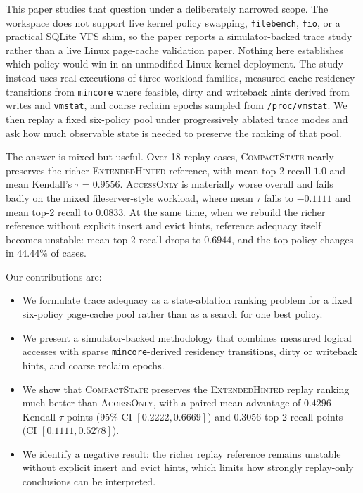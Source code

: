 \documentclass{article}
\newcommand{\traceext}{\textsc{ExtendedHinted}}
\newcommand{\tracecompact}{\textsc{CompactState}}
\newcommand{\traceaccess}{\textsc{AccessOnly}}
\begin{document}
This paper studies that question under a deliberately narrowed scope. The workspace does not support live kernel policy swapping, \texttt{filebench}, \texttt{fio}, or a practical SQLite VFS shim, so the paper reports a simulator-backed trace study rather than a live Linux page-cache validation paper. Nothing here establishes which policy would win in an unmodified Linux kernel deployment. The study instead uses real executions of three workload families, measured cache-residency transitions from \texttt{mincore} where feasible, dirty and writeback hints derived from writes and \texttt{vmstat}, and coarse reclaim epochs sampled from \texttt{/proc/vmstat}. We then replay a fixed six-policy pool under progressively ablated trace modes and ask how much observable state is needed to preserve the ranking of that pool.

The answer is mixed but useful. Over 18 replay cases, \tracecompact{} nearly preserves the richer \traceext{} reference, with mean top-2 recall $1.0$ and mean Kendall's $\tau=0.9556$. \traceaccess{} is materially worse overall and fails badly on the mixed fileserver-style workload, where mean $\tau$ falls to $-0.1111$ and mean top-2 recall to $0.0833$. At the same time, when we rebuild the richer reference without explicit insert and evict hints, reference adequacy itself becomes unstable: mean top-2 recall drops to $0.6944$, and the top policy changes in $44.44\%$ of cases.

Our contributions are:
\begin{itemize}
  \item We formulate trace adequacy as a state-ablation ranking problem for a fixed six-policy page-cache pool rather than as a search for one best policy.
  \item We present a simulator-backed methodology that combines measured logical accesses with sparse \texttt{mincore}-derived residency transitions, dirty or writeback hints, and coarse reclaim epochs.
  \item We show that \tracecompact{} preserves the \traceext{} replay ranking much better than \traceaccess{}, with a paired mean advantage of $0.4296$ Kendall-$\tau$ points (95\% CI $[0.2222, 0.6669]$) and $0.3056$ top-2 recall points (CI $[0.1111, 0.5278]$).
  \item We identify a negative result: the richer replay reference remains unstable without explicit insert and evict hints, which limits how strongly replay-only conclusions can be interpreted.
\end{itemize}
\end{document}
